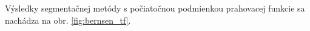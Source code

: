\documentclass[a4paper,11pt,oneside]{article}%
\begin{document}
Výsledky segmentačnej metódy s počiatočnou podmienkou prahovacej funkcie sa nachádza na obr. \ref{fig:bernsen_tf}.

\begin{figure}[H]  
    \hspace{5px}

\end{figure}
\end{document}
